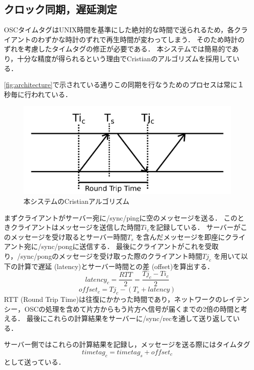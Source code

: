 \subsection{クロック同期，遅延測定}
OSCタイムタグはUNIX時間を基準にした絶対的な時間で送られるため，各クライアントのわずかな時計のずれで再生時間が変わってしまう．
そのため時計のずれを考慮したタイムタグの修正が必要である．
本システムでは簡易的であり，十分な精度が得られるという理由でCristianのアルゴリズム\cite{cristian}を採用している．

\ref{fig:architecture}で示されている通りこの同期を行なうためのプロセスは常に１秒毎に行われている．

\begin{figure}[htbp]
  \centering
  \includegraphics[width=0.8\linewidth]{src/img/cristian.png}
  \caption{本システムのCristianアルゴリズム}
  \label{fig:cristian}
\end{figure}

まずクライアントがサーバー宛に/sync/pingに空のメッセージを送る．
このときクライアントはメッセージを送信した時間\begin{math}
  Ti_c
\end{math}を記録している．
サーバーがこのメッセージを受け取るとサーバー時間\begin{math}
  T_s
\end{math}
を含んだメッセージを即座にクライアント宛に/sync/pongに送信する．
最後にクライアントがこれを受取り，/sync/pongのメッセージを受け取った際のクライアント時間\begin{math}
  Tj_c
\end{math}
を用いて以下の計算で遅延 (latency)とサーバー時間との差 (offset)を算出する．
\begin{displaymath}
  latency_c = \frac{RTT}{2} = \frac{Tj_c - Ti_c}{2}
\end{displaymath}
\begin{displaymath}
  offset_c = Tj_c - (T_s + latency)
\end{displaymath}
RTT (Round Trip Time)は往復にかかった時間であり，ネットワークのレイテンシー，OSCの処理を含めて片方からもう片方へ信号が届くまでの2倍の時間と考える．
最後にこれらの計算結果をサーバーに/sync/recを通して送り返している．

サーバー側ではこれらの計算結果を記録し，メッセージを送る際にはタイムタグ
\begin{displaymath}timetag_c = timetag_s + offset_c\end{displaymath}
として送っている．


